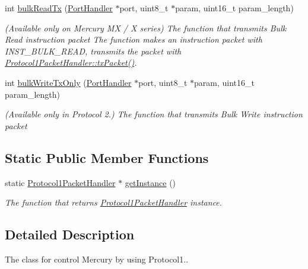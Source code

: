 \begin{DoxyCompactItemize}
int \hyperlink{classmercury_1_1_protocol1_packet_handler_a89499a6a49bdbd54f3af9930c0fa21b1}{bulk\+Read\+Tx} (\hyperlink{classmercury_1_1_port_handler}{Port\+Handler} $\ast$port, uint8\+\_\+t $\ast$param, uint16\+\_\+t param\+\_\+length)
\begin{DoxyCompactList}\small\item\em (Available only on Mercury MX / X series) The function that transmits Bulk Read instruction packet  The function makes an instruction packet with I\+N\+S\+T\+\_\+\+B\+U\+L\+K\+\_\+\+R\+E\+AD,  transmits the packet with \hyperlink{classmercury_1_1_protocol1_packet_handler_a232c9159fef54e7aaf38859fcce5a322}{Protocol1\+Packet\+Handler\+::tx\+Packet()}. \end{DoxyCompactList}\item 
int \hyperlink{classmercury_1_1_protocol1_packet_handler_ab6530fd46aaddc4446e88fad643f3af6}{bulk\+Write\+Tx\+Only} (\hyperlink{classmercury_1_1_port_handler}{Port\+Handler} $\ast$port, uint8\+\_\+t $\ast$param, uint16\+\_\+t param\+\_\+length)
\begin{DoxyCompactList}\small\item\em (Available only in Protocol 2.) The function that transmits Bulk Write instruction packet \end{DoxyCompactList}\end{DoxyCompactItemize}
\subsection*{Static Public Member Functions}
\begin{DoxyCompactItemize}
\item 
static \hyperlink{classmercury_1_1_protocol1_packet_handler}{Protocol1\+Packet\+Handler} $\ast$ \hyperlink{classmercury_1_1_protocol1_packet_handler_a8bcb858c3166f4396fe8b59932b040cf}{get\+Instance} ()
\begin{DoxyCompactList}\small\item\em The function that returns \hyperlink{classmercury_1_1_protocol1_packet_handler}{Protocol1\+Packet\+Handler} instance. \end{DoxyCompactList}\end{DoxyCompactItemize}


\subsection{Detailed Description}
The class for control Mercury by using Protocol1.. 

